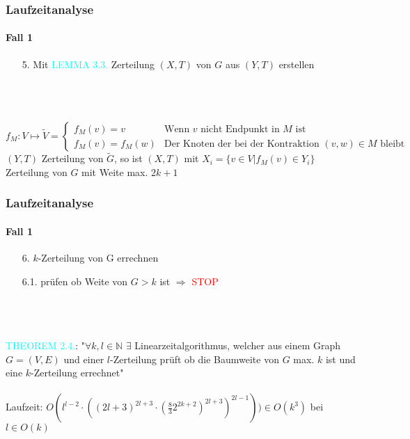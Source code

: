 \begin{frame}
\frametitle{Laufzeitanalyse}
\framesubtitle{Fall 1}

\begin{enumerate}
	\item[5.] Mit \textcolor{cyan}{LEMMA 3.3.} Zerteilung $(X,T)$ von $G$ aus $(Y,T)$ erstellen %
\end{enumerate}
\ \\
\ \\
\ \\
$
f_M: V \mapsto \widetilde{V} = \begin{cases} %
			f_M(v) = v &\text{Wenn } v \text{ nicht Endpunkt in } M \text{ ist} \\
			f_M(v) = f_M(w) &\text{Der Knoten der bei der Kontraktion }(v,w) \in M \text{ bleibt }
		\end{cases}
$ \\
$(Y,T)$ Zerteilung von $\widetilde{G}$, so ist $(X,T)$ mit $X_i = \{ v \in V | f_M(v) \in Y_i \}$ Zerteilung von $G$ mit Weite max. $2k+1$
\end{frame}


\begin{frame}
\frametitle{Laufzeitanalyse}
\framesubtitle{Fall 1}

\begin{enumerate}
	\item[6.] $k$-Zerteilung von G errechnen
	\item[6.1.] prüfen ob Weite von $G > k$ ist $\Rightarrow$ \textcolor{red}{STOP}
\end{enumerate}
\ \\
\ \\
\ \\
\textcolor{cyan}{THEOREM 2.4.}: "$\forall k,l \in \mathbb{N}$ $\exists$ Linearzeitalgorithmus, welcher aus einem Graph $G=(V,E)$ und einer $l$-Zerteilung prüft ob die Baumweite von $G$ max. $k$ ist und eine $k$-Zerteilung errechnet" \\
\ \\
Laufzeit: $O(l^{l-2} \cdot ((2l+3)^{2l+3} \cdot (\frac{8}{3} 2^{2k+2})^{2l+3})^{2l-1})) \in O(k^3)$ bei $l \in O(k)$
\end{frame}